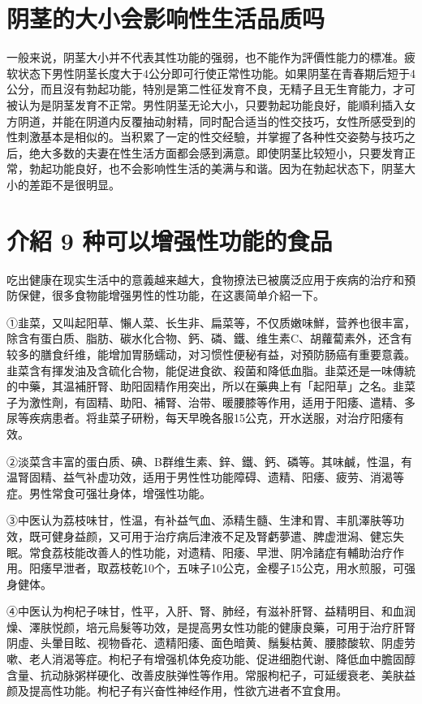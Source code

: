 \documentclass[12pt,UTF8]{ctexbook}
\begin{document}
\section{阴茎的大小会影响性生活品质吗}

一般来说，阴茎大小并不代表其性功能的强弱，也不能作为評價性能力的標准。疲软状态下男性阴茎长度大于4公分即可行使正常性功能。如果阴茎在青春期后短于4公分，而且沒有勃起功能，特別是第二性征发育不良，无精子且无生育能力，才可被认为是阴茎发育不正常。男性阴茎无论大小，只要勃起功能良好，能順利插入女方阴道，并能在阴道内反覆抽动射精，同时配合适当的性交技巧，女性所感受到的性刺激基本是相似的。当积累了一定的性交经驗，并掌握了各种性交姿勢与技巧之后，绝大多数的夫妻在性生活方面都会感到满意。即使阴茎比较短小，只要发育正常，勃起功能良好，也不会影响性生活的美满与和谐。因为在勃起状态下，阴茎大小的差距不是很明显。

\section{介紹 9 种可以增强性功能的食品}

吃出健康在现实生活中的意義越来越大，食物撩法已被廣泛应用于疾病的治疗和預防保健，很多食物能增强男性的性功能，在这裹简单介紹一下。

①韭菜，又叫起阳草、懶人菜、长生非、扁菜等，不仅质嫩味鮮，营养也很丰富，除含有蛋白质、脂肪、碳水化合物、鈣、磷、鐵、维生素C、胡蘿蔔素外，还含有较多的膳食纤维，能增加胃肠蠕动，对习惯性便秘有益，对預防肠癌有重要意義。韭菜含有揮发油及含硫化合物，能促进食欲、殺菌和降低血脂。韭菜还是一味傳統的中藥，其温補肝腎、助阳固精作用突出，所以在藥典上有「起阳草」之名。韭菜子为激性劑，有固精、助阳、補腎、治带、暖腰膝等作用，适用于阳痿、遣精、多尿等疾病患者。将韭菜子研粉，每天早晚各服15公克，开水送服，对治疗阳痿有效。

②淡菜含丰富的蛋白质、碘、B群维生素、鋅、鐵、鈣、磷等。其味鹹，性温，有温腎固精、益气补虚功效，适用于男性性功能障碍、遗精、阳痿、疲劳、消渴等症。男性常食可强壮身体，增强性功能。

③中医认为荔枝味甘，性温，有补益气血、添精生髓、生津和胃、丰肌澤肤等功效，既可健身益颜，又可用于治疗病后津液不足及腎虧夢遣、脾虚泄潟、健忘失眠。常食荔枝能改善人的性功能，对遗精、阳痿、早泄、阴冷諸症有輔助治疗作用。阳痿早泄者，取荔枝乾10个，五味子10公克，金樱子15公克，用水煎服，可强身健体。

④中医认为枸杞子味甘，性平，入肝、腎、肺经，有滋补肝腎、益精明目、和血润燥、澤肤悦颜，培元烏髮等功效，是提高男女性功能的健康良藥，可用于治疗肝腎阴虛、头暈目眩、视物昏花、遗精阳痿、面色暗黄、鬚髮枯黄、腰膝酸软、阴虛劳嗽、老人消渴等症。枸杞子有增强机体免疫功能、促进细胞代谢、降低血中膽固醇含量、抗动脉粥样硬化、改善皮肤弹性等作用。常服枸杞子，可延缓衰老、美肤益颜及提高性功能。枸杞子有兴奋性神经作用，性欲亢进者不宜食用。
\end{document}

